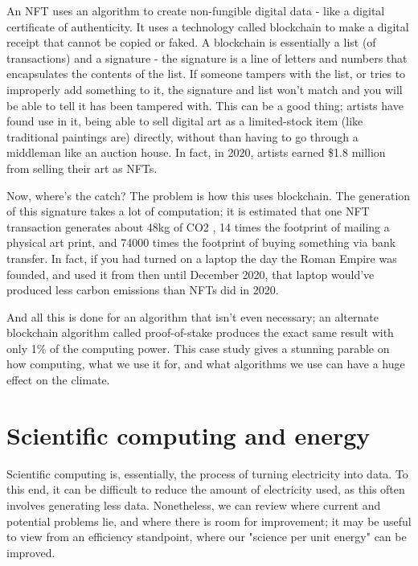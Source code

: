 \documentclass{article}
\begin{document}
An NFT uses an algorithm to create non-fungible digital data - like a digital certificate of authenticity. It uses a technology called blockchain to make a digital receipt that cannot be copied or faked. A blockchain is essentially a list (of transactions) and a signature - the signature is a line of letters and numbers that encapsulates the contents of the list. If someone tampers with the list, or tries to improperly add something to it, the signature and list won't match and you will be able to tell it has been tampered with.\citep{narayanan2017bitcoin} This can be a good thing; artists have found use in it, being able to sell digital art as a limited-stock item (like traditional paintings are) directly, without than having to go through a middleman like an auction house. In fact, in 2020,  artists earned \$1.8 million \citep{redman2020NFT} from selling their art as NFTs.\newline

Now, where's the catch? The problem is how this uses blockchain. The generation of this signature takes a lot of computation; it is estimated that one NFT transaction generates about 48kg of CO2 \citep{atken2020unreasonable}, 14 times the footprint of mailing a physical art print, and 74000 times the footprint of buying something via bank transfer. \citep{qiu2021what} In fact, if you had turned on a laptop the day the Roman Empire was founded, and used it from then until December 2020, that laptop would've produced less carbon emissions than NFTs did in 2020. \citep{atken2020unreasonable} \newline

And all this is done for an algorithm that isn't even necessary; an alternate blockchain algorithm called proof-of-stake produces the exact same result with only 1\% of the computing power. \citep{saleh2021blockchain} This case study gives a stunning parable on how computing, what we use it for, and what algorithms we use can have a huge effect on the climate.



\section{Scientific computing and energy}
Scientific computing is, essentially, the process of turning electricity into data. To this end, it can be difficult to reduce the amount of electricity used, as this often involves generating less data. Nonetheless, we can review where current and potential problems lie, and where there is room for improvement; it may be useful to view from an efficiency standpoint, where our "science per unit energy" can be improved.
\end{document}

